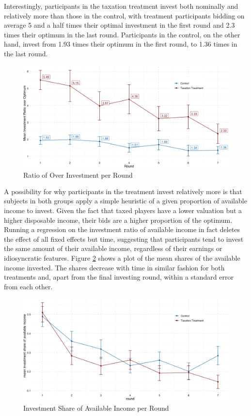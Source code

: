Interestingly, participants in the taxation treatment invest both nominally and relatively more than those in the control, with treatment participants bidding on average 5 and a half times their optimal investment in the first round and 2.3 times their optimum in the last round. Participants in the control, on the other hand, invest from 1.93 times their optimum in the first round, to 1.36 times in the last round.\\


\begin{figure}
    \centering
    \includegraphics[width=\textwidth]{graphs/over_invest.png}
    \caption{Ratio of Over Investment per Round}
    \label{fig:over_invest}
\end{figure}


A possibility for why participants in the treatment invest relatively more is that subjects in both groups apply a simple heuristic of a given proportion of available income to invest. Given the fact that taxed players have a lower valuation but a higher disposable income, their bids are a higher proportion of the optimum. Running a regression on the investment ratio of available income in fact deletes the effect of all fixed effects but time, suggesting that participants tend to invest the same amount of their available income, regardless of their earnings or idiosyncratic features. Figure \ref{fig:invest_share} shows a plot of the mean shares of the available income invested. The shares decrease with time in similar fashion for both treatments and, apart from the final investing round, within a standard error from each other.\\

\begin{figure}[h!]
    \centering
    \includegraphics[width=\textwidth]{graphs/investment_share_geom_line.png}
    \caption{Investment Share of Available Income per Round}
    \label{fig:invest_share}
\end{figure}

